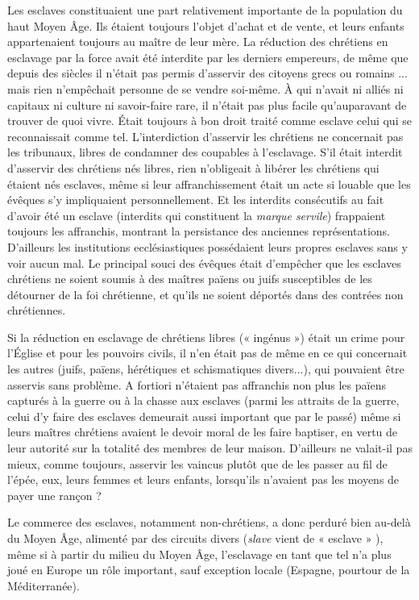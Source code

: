  Les esclaves constituaient une part relativement importante de la population du haut Moyen Âge. Ils étaient toujours l'objet d'achat et de vente, et leurs enfants appartenaient toujours au maître de leur mère. La réduction des chrétiens en esclavage par la force avait été interdite par les derniers empereurs, de même que depuis des siècles il n'était pas permis d'asservir des citoyens grecs ou romains ... mais rien n'empêchait personne de se vendre soi-même. À qui n'avait ni alliés ni capitaux ni culture ni savoir-faire rare, il n'était pas plus facile qu'auparavant de trouver de quoi vivre. Était toujours à bon droit traité comme esclave celui qui se reconnaissait comme tel. L'interdiction d'asservir les chrétiens ne concernait pas les tribunaux, libres de condamner des coupables à l'esclavage. S'il était interdit d'asservir des chrétiens nés libres, rien n'obligeait à libérer les chrétiens qui étaient nés esclaves, même si leur affranchissement était un acte si louable que les évêques s'y impliquaient personnellement. Et les interdits consécutifs au fait d'avoir été un esclave (interdits qui constituent la \emph{marque servile}) frappaient toujours les affranchis, montrant la persistance des anciennes représentations. D'ailleurs les institutions ecclésiastiques possédaient leurs propres esclaves sans y voir aucun mal. Le principal souci des évêques était d'empêcher que les esclaves chrétiens ne soient soumis à des maîtres païens ou juifs susceptibles de les détourner de la foi chrétienne, et qu'ils ne soient déportés dans des contrées non chrétiennes. 

 Si la réduction en esclavage de chrétiens libres (« ingénus ») était un crime pour l'Église et pour les pouvoirs civils, il n'en était pas de même en ce qui concernait les autres (juifs, païens, hérétiques et schismatiques divers...), qui pouvaient être asservis sans problème. A fortiori n'étaient pas affranchis non plus les païens capturés à la guerre ou à la chasse aux esclaves (parmi les attraits de la guerre, celui d'y faire des esclaves demeurait aussi important que par le passé) même si leurs maîtres chrétiens avaient le devoir moral de les faire baptiser, en vertu de leur autorité sur la totalité des membres de leur maison. D'ailleurs ne valait-il pas mieux, comme toujours, asservir les vaincus plutôt que de les passer au fil de l'épée, eux, leurs femmes et leurs enfants, lorsqu'ils n'avaient pas les moyens de payer une rançon ?

 Le commerce des esclaves, notamment non-chrétiens, a donc perduré bien au-delà du Moyen Âge, alimenté par des circuits divers (\emph{slave} vient de « esclave » ), même si à partir du milieu du Moyen Âge, l'esclavage en tant que tel n'a plus joué en Europe un rôle important, sauf exception locale (Espagne, pourtour de la Méditerranée). 

